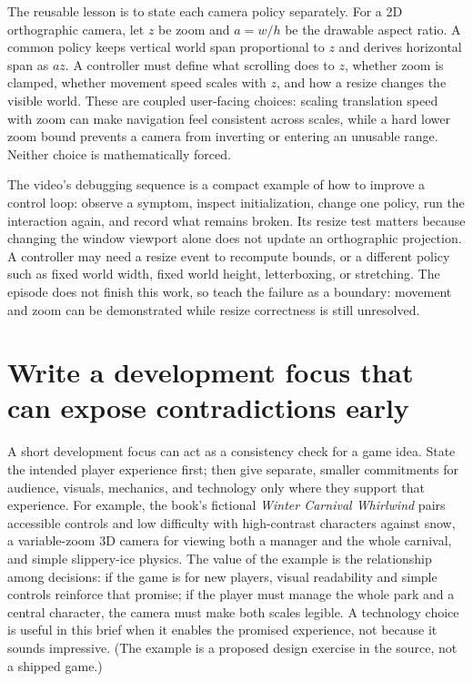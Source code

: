 The reusable lesson is to state each camera policy separately. For a 2D orthographic camera, let \(z\) be zoom and \(a=w/h\) be the drawable aspect ratio. A common policy keeps vertical world span proportional to \(z\) and derives horizontal span as \(az\). A controller must define what scrolling does to \(z\), whether zoom is clamped, whether movement speed scales with \(z\), and how a resize changes the visible world. These are coupled user-facing choices: scaling translation speed with zoom can make navigation feel consistent across scales, while a hard lower zoom bound prevents a camera from inverting or entering an unusable range. Neither choice is mathematically forced.

The video's debugging sequence is a compact example of how to improve a control loop: observe a symptom, inspect initialization, change one policy, run the interaction again, and record what remains broken. Its resize test matters because changing the window viewport alone does not update an orthographic projection. A controller may need a resize event to recompute bounds, or a different policy such as fixed world width, fixed world height, letterboxing, or stretching. The episode does not finish this work, so teach the failure as a boundary: movement and zoom can be demonstrated while resize correctness is still unresolved.

\section{Write a development focus that can expose contradictions early}\label{06-engine-ii-ch046-write-a-development-focus-that-can-expose-contradictions-early}

\hypertarget{06-engine-ii-ch046-write-a-development-focus-that-can-expose-contradictions-early}{}

A short development focus can act as a consistency check for a game idea. State the intended player experience first; then give separate, smaller commitments for audience, visuals, mechanics, and technology only where they support that experience. For example, the book's fictional \emph{Winter Carnival Whirlwind} pairs accessible controls and low difficulty with high-contrast characters against snow, a variable-zoom 3D camera for viewing both a manager and the whole carnival, and simple slippery-ice physics. The value of the example is the relationship among decisions: if the game is for new players, visual readability and simple controls reinforce that promise; if the player must manage the whole park and a central character, the camera must make both scales legible. A technology choice is useful in this brief when it enables the promised experience, not because it sounds impressive. (The example is a proposed design exercise in the source, not a shipped game.)

